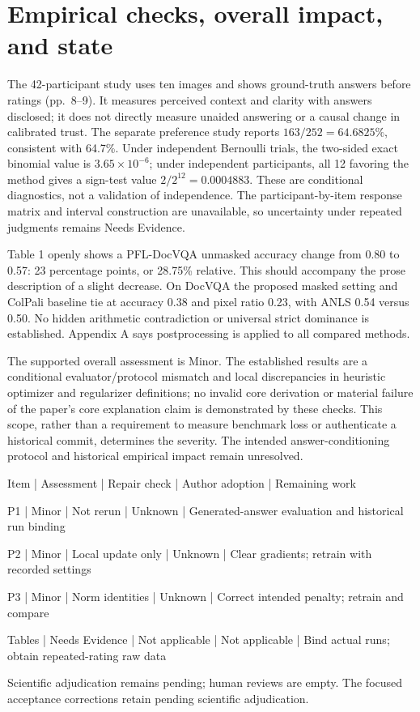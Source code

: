 \documentclass[10pt]{article}
\begin{document}
\section*{Empirical checks, overall impact, and state}
The 42-participant study uses ten images and shows ground-truth answers before ratings (pp. 8–9). It measures perceived context and clarity with answers disclosed; it does not directly measure unaided answering or a causal change in calibrated trust. The separate preference study reports \(163/252=64.6825\%\), consistent with 64.7\%. Under independent Bernoulli trials, the two-sided exact binomial value is \(3.65\times10^{-6}\); under independent participants, all 12 favoring the method gives a sign-test value \(2/2^{12}=0.0004883\). These are conditional diagnostics, not a validation of independence. The participant-by-item response matrix and interval construction are unavailable, so uncertainty under repeated judgments remains Needs Evidence.\par
Table 1 openly shows a PFL-DocVQA unmasked accuracy change from 0.80 to 0.57: 23 percentage points, or 28.75\% relative. This should accompany the prose description of a slight decrease. On DocVQA the proposed masked setting and ColPali baseline tie at accuracy 0.38 and pixel ratio 0.23, with ANLS 0.54 versus 0.50. No hidden arithmetic contradiction or universal strict dominance is established. Appendix A says postprocessing is applied to all compared methods.\par
The supported overall assessment is Minor. The established results are a conditional evaluator/protocol mismatch and local discrepancies in heuristic optimizer and regularizer definitions; no invalid core derivation or material failure of the paper’s core explanation claim is demonstrated by these checks. This scope, rather than a requirement to measure benchmark loss or authenticate a historical commit, determines the severity. The intended answer-conditioning protocol and historical empirical impact remain unresolved.\par
Item | Assessment | Repair check | Author adoption | Remaining work\par
P1 | Minor | Not rerun | Unknown | Generated-answer evaluation and historical run binding\par
P2 | Minor | Local update only | Unknown | Clear gradients; retrain with recorded settings\par
P3 | Minor | Norm identities | Unknown | Correct intended penalty; retrain and compare\par
Tables | Needs Evidence | Not applicable | Not applicable | Bind actual runs; obtain repeated-rating raw data\par
Scientific adjudication remains pending; human reviews are empty. The focused acceptance corrections retain pending scientific adjudication.\par
\end{document}
